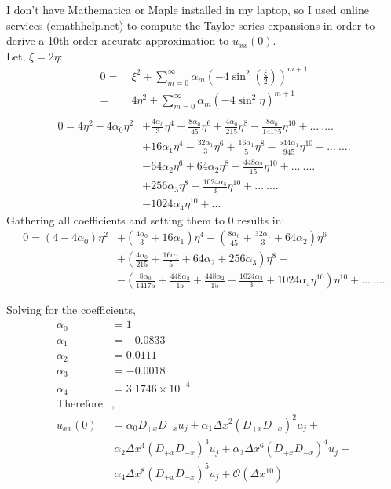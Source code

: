 \documentclass[11pt]{article}
\newcommand{\Dpx}{D_{+x}}
\newcommand{\Dmx}{D_{-x}}
\newcommand{\Oc}{\mathcal{O}}
\newcommand{\dx}{\Delta x}
\newcommand{\uxx}{u_{xx}(0)}
\begin{document}
\begin{enumerate}
\begin{enumerate}
    I don't have Mathematica or Maple installed in my laptop, so I used online services (emathhelp.net) to compute the Taylor series expansions in order to derive a 10th order accurate approximation to $\uxx$. \\
    Let, $\xi = 2\eta$:
    \begin{align*}
    0 = & \ \xi^2 + \sum_{m=0}^{\infty} \alpha_m\left(-4\sin^2\left(\frac{\xi}{2}\right)\right)^{m+1} \\
    = & \ 4\eta^2 + \sum_{m=0}^{\infty} \alpha_m\left(-4\sin^2\eta\right)^{m+1}  \\
    \end{align*}
   \begin{align*}
   0 = 4\eta^2 -4\alpha_0 \eta^2 & + \frac{4\alpha_0}{3}\eta^4 - \frac{8\alpha_0}{45}\eta^6 + \frac{4\alpha_0}{215}\eta^8  - \frac{8\alpha_0}{14175}\eta^{10} + ...\ .... \\
   & + 16\alpha_1 \eta^4 - \frac{32\alpha_1}{3}\eta^6 + \frac{16\alpha_1}{5}\eta^8 - \frac{544\alpha_1}{945}\eta^{10} + ... \ .... \\  
   & - 64\alpha_2 \eta^6 + 64\alpha_2 \eta^8 - \frac{448\alpha_2}{15}\eta^{10} + ...\ .... \\
   & + 256\alpha_3 \eta^8 - \frac{1024\alpha_3}{3}\eta^{10} + ... \ .... \\
   & - 1024\alpha_4 \eta^{10} + ... 
   \end{align*}	
Gathering all coefficients and setting  them to 0 results in: 
\begin{align*}
0 = (4-4\alpha_0) \eta^2 & + \left(\frac{4\alpha_0}{3} + 16\alpha_1\right)\eta^4 -\left(\frac{8\alpha_0}{45} + \frac{32\alpha_1}{3} + 64\alpha_2 \right)\eta^6 \\
& + \left(\frac{4\alpha_0}{215} + \frac{16\alpha_1}{5} + 64\alpha_2 + 256\alpha_3\right)\eta^8 + \\
& - \left(\frac{8\alpha_0}{14175} + \frac{448\alpha_2}{15} + \frac{448\alpha_2}{15} + \frac{1024\alpha_3}{3} + 1024\alpha_4 \eta^{10} \right)\eta^{10} + ... \ ....
\end{align*}

Solving for the coefficients,
\begin{align*}
\alpha_0 &= 1 \\
\alpha_1 &= -0.0833 \\
\alpha_2 &= 0.0111 \\
\alpha_3 &= -0.0018 \\
\alpha_4 &= 3.1746\times 10^{-4} \\ 
\text{Therefore} &, \\
\uxx & = \alpha_0\Dpx\Dmx u_j + \alpha_1 \dx^2 \left(\Dpx\Dmx\right)^2 u_j + \\
& \ \alpha_2 \dx^4  \left(\Dpx\Dmx\right)^3 u_j  + \alpha_3 \dx^6 \left(\Dpx\Dmx\right)^4 u_j + \\
& \  \alpha_4 \dx^8 \left(\Dpx\Dmx\right)^5 u_j + \Oc(\dx^{10}) 
\end{align*}


\end{enumerate}
\end{enumerate}
\end{document}
